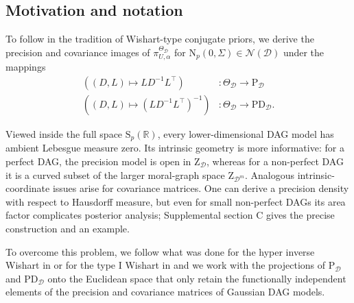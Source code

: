 \documentclass[12pt]{article}
\newcommand{\D}{\mathcal{D}}
\theoremstyle{plain}
\theoremstyle{definition}
\theoremstyle{remark}
\begin{document}
 \subsection{Motivation and notation}\label{subs:motive}
To follow in the tradition of Wishart-type conjugate priors, we derive
the precision and covariance images of
$\pi^{\Theta_{\D}}_{U,\alpha}$ for
$\mathrm N_p(0,\Sigma)\in\mathscr N(\D)$ under the mappings
    \begin{align}
 \label{eq:tpd} \left((D,L)\mapsto LD^{-1}L^{\top}\right)&:\Theta_{\D}\rightarrow \mathrm{P}_{\D}\\
 \label{eq:tpdd}\left((D,L)\mapsto \left(LD^{-1}L^{\top}\right)^{-1}\right)&:\Theta_{\D}\rightarrow \mathrm{PD}_{\D}.  
  \end{align}
  
  
   \noindent Viewed inside the full space $\mathrm{S}_p(\mathbb{R})$, every
lower-dimensional DAG model has ambient Lebesgue measure zero.  Its intrinsic
geometry is more informative: for a perfect DAG, the precision model is open
in $\mathrm{Z}_{\D}$, whereas for a non-perfect DAG it is a curved subset of
the larger moral-graph space $\mathrm{Z}_{\D^m}$.  Analogous intrinsic-coordinate
issues arise for covariance matrices.  One can derive a precision density with
respect to Hausdorff measure, but even for small non-perfect DAGs its area
factor complicates posterior analysis; Supplemental section C gives the
precise construction and an example.
 
 \indent To overcome this problem, we follow what was done for the hyper inverse Wishart in \cite{lauritzen96*} or for the type I Wishart in \cite{letac07*} and we work with the projections of $\mathrm{P}_{\D}$ and $\mathrm{PD}_{\D}$ onto the Euclidean space that only retain the functionally independent elements of the precision and covariance matrices of Gaussian DAG models. 
 
\end{document}
